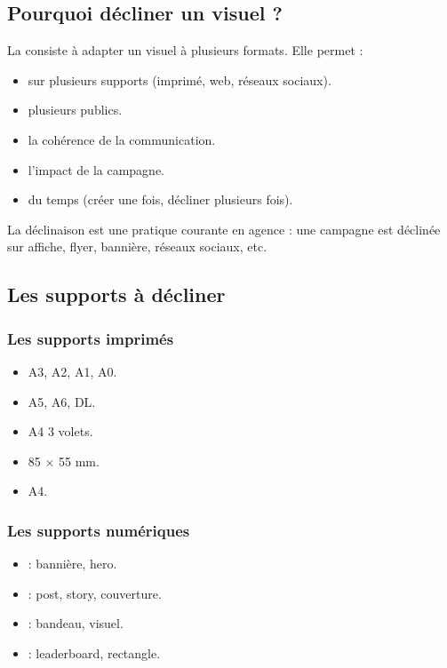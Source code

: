 \subsection{Pourquoi décliner un visuel ?}

La  consiste à adapter un visuel à plusieurs formats. Elle permet :

\begin{itemize}
    \item {} sur plusieurs supports (imprimé, web, réseaux sociaux).
    \item {} plusieurs publics.
    \item {} la cohérence de la communication.
    \item {} l'impact de la campagne.
    \item {} du temps (créer une fois, décliner plusieurs fois).
\end{itemize}

La déclinaison est une pratique courante en agence : une campagne est déclinée sur affiche, flyer, bannière, réseaux sociaux, etc.

\subsection{Les supports à décliner}

\subsubsection{Les supports imprimés}

\begin{itemize}
    \item {} A3, A2, A1, A0.
    \item {} A5, A6, DL.
    \item {} A4 3 volets.
    \item {} 85 × 55 mm.
    \item {} A4.
\end{itemize}

\subsubsection{Les supports numériques}

\begin{itemize}
    \item {} : bannière, hero.
    \item {} : post, story, couverture.
    \item {} : bandeau, visuel.
    \item {} : leaderboard, rectangle.
\end{itemize}

